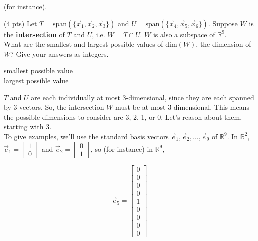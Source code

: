 \documentclass[11pt]{article}
\begin{document}
\begin{prob}[(14 pts)]
\begin{subprob}
\begin{solution}
(for instance).

\end{solution}

\end{subprob}

\vspace{1em}

\begin{subprob}(4 pts) Let $T = \text{span}(\{ \vec x_1, \vec x_2, \vec x_3 \})$ and $U = \text{span}(\{ \vec x_4, \vec x_5, \vec x_6 \})$. Suppose $W$ is the \textbf{intersection} of $T$ and $U$, i.e. $W = T \cap U$. $W$ is also a subspace of $\mathbb{R}^9$. \\

What are the smallest and largest possible values of $\text{dim}(W)$, the dimension of $W$? Give your answers as integers.

smallest possible value $=$  \\
largest possible value $=$ 

\begin{solution}
$T$ and $U$ are each individually at most 3-dimensional, since they are each spanned by 3 vectors. So, the intersection $W$ must be at most 3-dimensional. This means the possible dimensions to consider are 3, 2, 1, or 0. Let's reason about them, starting with 3. \\

To give examples, we'll use the standard basis vectors $\vec e_1, \vec e_2, \ldots, \vec e_9$ of $\mathbb{R}^9$. In $\mathbb{R}^2$, $\vec e_1 = \begin{bmatrix} 1 \\ 0 \end{bmatrix}$ and $\vec e_2 = \begin{bmatrix} 0 \\ 1 \end{bmatrix}$, so (for instance) in $\mathbb{R}^9$,

$$\vec e_5 = \begin{bmatrix} 0 \\ 0 \\ 0 \\ 0 \\ 1 \\ 0 \\ 0 \\ 0 \\ 0 \end{bmatrix}$$



\end{solution}
\end{subprob}
\end{prob}
\end{document}
